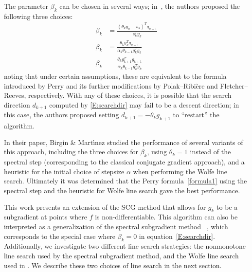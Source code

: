 \documentclass[]{interact}
\theoremstyle{plain}%
\theoremstyle{definition}
\theoremstyle{remark}
\begin{document}
The parameter $\beta_k$ can be chosen in several ways; in~\cite{Bm01}, the authors proposed the following three choices:
\begin{align}
   \label{formula1}
\beta_k&=\frac{(\theta_ky_k-s_k)^Tg_{k+1}}{s_k^Ty_k}\\
   \label{formula2}
\beta_k&=\frac{\theta_ky_k^Tg_{k+1}}{\alpha_k\theta_{k-1}g_k^Tg_k}\\
   \label{formula3}
\beta_k&=\frac{\theta_kg_{k+1}^Tg_{k+1}}{\alpha_k\theta_{k-1}g_k^Tg_k}
\end{align}
noting that under certain assumptions, these are equivalent to the formula introduced by Perry \cite{Perry:78} and its further modifications by Polak–Ribi\`ere  and Fletcher–Reeves, respectively. With any of these choices, it is possible that the search direction $d_{k+1}$ computed by \eqref{E:searchdir} may fail to be a descent direction; in this case, the authors proposed setting $d_{k+1} = -\theta_k g_{k+1}$ to ``restart'' the algorithm.

In their paper, Birgin \& Mart\'{\i}nez studied the performance of several variants of this approach, including the three choices for $\beta_k$, using $\theta_k = 1$ instead of the spectral step (corresponding to the classical conjugate gradient approach), and a heuristic for the initial choice of stepsize $\alpha$ when performing the Wolfe line search. Ultimately it was determined that the Perry formula~\eqref{formula1} using the spectral step and the heuristic for Wolfe line search gave the best performance.


This work presents an extension of the SCG method that allows for $g_k$ to be a subgradient at points where $f$ is non-differentiable. This algorithm can also be interpreted as a generalization of the spectral subgradient method ~\cite{Loreto:19}, which corresponds to the special case where $\beta_k = 0$ in equation~\eqref{E:searchdir}. Additionally, we investigate two different line search strategies: the nonmonotone line search used by the spectral subgradient method, and the Wolfe line search used in \cite{Bm01}. We describe these two choices of line search in the next section.
\end{document}
